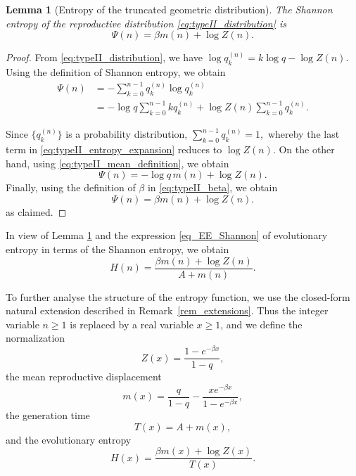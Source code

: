 \documentclass[10pt,a4paper]{amsart}
\newtheorem{lem}[thm]{Lemma}
\theoremstyle{definition}
\theoremstyle{remark}
\numberwithin{equation}{section}
\begin{document}
\begin{lem}[Entropy of the truncated geometric distribution]
	\label{lemma_truncated}
The Shannon entropy of the reproductive distribution
\eqref{eq:typeII_distribution}
is
\begin{equation}
\Psi(n)=\beta m(n)+\log Z(n).
\label{eq:typeII_shannon}
\end{equation}
\end{lem}

\begin{proof}
From
\eqref{eq:typeII_distribution},
we have
$
\log q_k^{(n)}
=
k\log q-\log Z(n).
$
Using the definition of Shannon entropy, we obtain
\begin{align}
\Psi(n)
&=
-\sum_{k=0}^{n-1}
q_k^{(n)}\log q_k^{(n)}\\
&=
-\log q
\sum_{k=0}^{n-1}kq_k^{(n)}
+
\log Z(n)
\sum_{k=0}^{n-1}q_k^{(n)}.
\label{eq:typeII_entropy_expansion}
\end{align}

Since
\(
\{q_k^{(n)}\}
\)
is a probability distribution,
$
\sum_{k=0}^{n-1}q_k^{(n)}=1,
$
whereby the last term in
\eqref{eq:typeII_entropy_expansion}
reduces to \(\log Z(n)\). On the other hand, using
\eqref{eq:typeII_mean_definition},
we obtain
\[
\Psi(n)
=
-\log q\,m(n)+\log Z(n).
\]
Finally, using the definition of $\beta$ in
\eqref{eq:typeII_beta},
we obtain
\[
\Psi(n)
=
\beta m(n)+\log Z(n).
\]
as claimed. 
\end{proof}
In view of Lemma \ref{lemma_truncated} and the expression \eqref{eq_EE_Shannon} of evolutionary entropy 
in terms of the Shannon entropy,
we obtain
\begin{equation}
H(n)
=
\frac{
\beta m(n)+\log Z(n)
}{
A+m(n)
}.
\label{eq:typeII_entropy}
\end{equation}

To further analyse the structure of the entropy function, we use the closed-form natural extension described in Remark~\ref{rem_extensions}. Thus the integer variable \(n\ge1\) is replaced by a real variable \(x\ge1\), and we define
the normalization
\begin{equation}
Z(x)
=
\frac{1-e^{-\beta x}}{1-q},
\label{eq:typeII_Zxi}
\end{equation}
the mean reproductive displacement
\begin{equation}
m(x)
=
\frac{q}{1-q}
-
\frac{x e^{-\beta x}}
{1-e^{-\beta x}},
\label{eq:typeII_mxi}
\end{equation}
the generation time
\begin{equation}
T(x)=A+m(x),
\label{eq:typeII_Txi}
\end{equation}
and the evolutionary entropy
\begin{equation}
H(x)
=
\frac{
\beta m(x)+\log Z(x)
}{
T(x)
}.
\label{eq:typeII_Hxi}
\end{equation}
\end{document}
